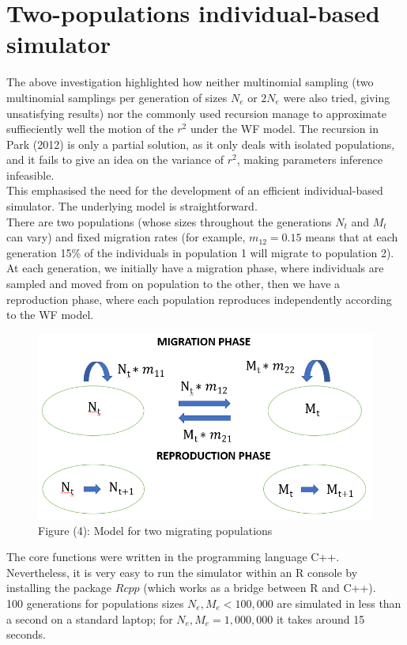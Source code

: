 \documentclass[a4paper,12pt]{article}
\begin{document}
\section{Two-populations individual-based simulator}
The above investigation highlighted how neither multinomial sampling (two multinomial samplings per generation of sizes $N_e$ or $2N_e$ were also tried, giving unsatisfying results) nor the commonly used recursion manage to approximate suffieciently well the motion of the $r^2$ under the WF model. The recursion in Park (2012) is only a partial solution, as it only deals with isolated populations, and it fails to give an idea on the variance of $r^2$, making parameters inference infeasible.\\

This emphasised the need for the development of an efficient individual-based simulator. The underlying model is straightforward.\\
There are two populations (whose sizes throughout the generations $N_t$ and $M_t$ can vary) and fixed migration rates (for example, $m_{12} = 0.15$ means that at each generation 15\% of the individuals in population 1 will migrate to population 2).\\
At each generation, we initially have a migration phase, where individuals are sampled and moved from on population to the other, then we have a reproduction phase, where each population reproduces independently according to the WF model.

\begin{figure}[H]
    \centering
    \includegraphics[scale=0.8]{4.png}%
    \caption*{Figure (4): Model for two migrating populations}%
\end{figure}%
\pagebreak

The core functions were written in the programming language C++. Nevertheless, it is very easy to run the simulator within an R console by installing the package $Rcpp$  (which works as a bridge between R and C++).\\
100 generations for populations sizes $N_e, M_e < 100,000$ are simulated in less than a second on a standard laptop; for $N_e, M_e = 1,000,000$ it takes around 15 seconds.\\
\end{document}
